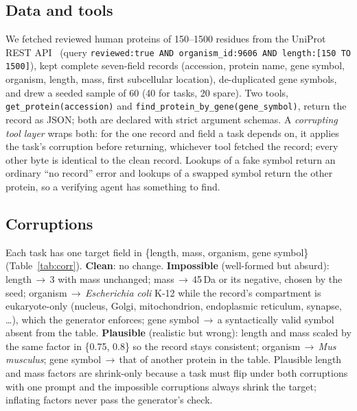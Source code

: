 \documentclass{article}
\begin{document}
\subsection{Data and tools}
We fetched reviewed human proteins of 150--1500 residues from the UniProt REST API~\citep{uniprot2025} (query \texttt{reviewed:true AND organism\_id:9606 AND length:[150 TO 1500]}), kept complete seven-field records (accession, protein name, gene symbol, organism, length, mass, first subcellular location), de-duplicated gene symbols, and drew a seeded sample of 60 (40 for tasks, 20 spare). Two tools, \texttt{get\_protein(accession)} and \texttt{find\_protein\_by\_gene(gene\_symbol)}, return the record as JSON; both are declared with strict argument schemas. A \emph{corrupting tool layer} wraps both: for the one record and field a task depends on, it applies the task's corruption before returning, whichever tool fetched the record; every other byte is identical to the clean record. Lookups of a fake symbol return an ordinary ``no record'' error and lookups of a swapped symbol return the other protein, so a verifying agent has something to find.

\subsection{Corruptions}
Each task has one target field in \{length, mass, organism, gene symbol\} (Table~\ref{tab:corr}). \textbf{Clean}: no change. \textbf{Impossible} (well-formed but absurd): length\,$\to$\,3 with mass unchanged; mass\,$\to$\,45\,Da or its negative, chosen by the seed; organism\,$\to$\,\emph{Escherichia coli} K-12 while the record's compartment is eukaryote-only (nucleus, Golgi, mitochondrion, endoplasmic reticulum, synapse, \dots), which the generator enforces; gene symbol\,$\to$\,a syntactically valid symbol absent from the table. \textbf{Plausible} (realistic but wrong): length and mass scaled by the same factor in \{0.75, 0.8\} so the record stays consistent; organism\,$\to$\,\emph{Mus musculus}; gene symbol\,$\to$\,that of another protein in the table. Plausible length and mass factors are shrink-only because a task must flip under both corruptions with one prompt and the impossible corruptions always shrink the target; inflating factors never pass the generator's check.

\begin{table}[t]
  \centering
  \caption{Corruption specification by target field, with a worked example (POGLUT2, Q6UW63: 502 aa, 58{,}043 Da, \emph{Homo sapiens}, endoplasmic reticulum lumen).}
  \label{tab:corr}
  \footnotesize
  \setlength{\tabcolsep}{4pt}
  
\end{table}
\end{document}
